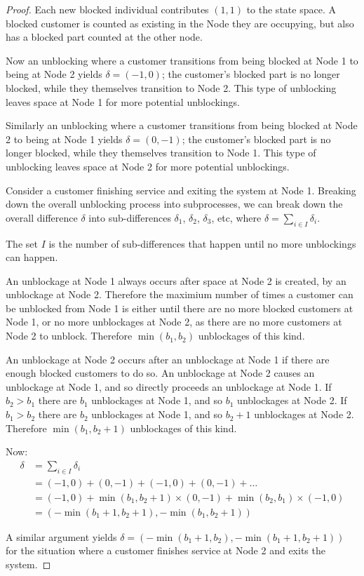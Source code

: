 \documentclass{article}
\begin{document}
\begin{proof}
  Each new blocked individual contributes $(1, 1)$ to the state space. A blocked customer is counted as existing in the Node they are occupying, but also has a blocked part counted at the other node.

  Now an unblocking where a customer transitions from being blocked at Node 1 to being at Node 2 yields $\delta = (-1, 0)$; the customer's blocked part is no longer blocked, while they themselves transition to Node 2.
  This type of unblocking leaves space at Node 1 for more potential unblockings.

  Similarly an unblocking where a customer transitions from being blocked at Node 2 to being at Node 1 yields $\delta = (0, -1)$; the customer's blocked part is no longer blocked, while they themselves transition to Node 1.
  This type of unblocking leaves space at Node 2 for more potential unblockings.

  Consider a customer finishing service and exiting the system at Node 1.
  Breaking down the overall unblocking process into subprocesses, we can break down the overall difference $\delta$ into sub-differences $\delta_1$, $\delta_2$, $\delta_3$, etc, where $\delta = \sum_{i \in I} \delta_i$.

  The set $I$ is the number of sub-differences that happen until no more unblockings can happen.

  An unblockage at Node 1 always occurs after space at Node 2 is created, by an unblockage at Node 2.
  Therefore the maximium number of times a customer can be unblocked from Node 1 is either until there are no more blocked customers at Node 1, or no more unblockages at Node 2, as there are no more customers at Node 2 to unblock.
  Therefore $\min(b_1, b_2)$ unblockages of this kind.

  An unblockage at Node 2 occurs after an unblockage at Node 1 if there are enough blocked customers to do so.
  An unblockage at Node 2 causes an unblockage at Node 1, and so directly proceeds an unblockage at Node 1.
  If $b_2 > b_1$ there are $b_1$ unblockages at Node 1, and so $b_1$ unblockages at Node 2.
  If $b_1 > b_2$ there are $b_2$ unblockages at Node 1, and so $b_2+1$ unblockages at Node 2.
  Therefore $\min(b_1, b_2+1)$ unblockages of this kind.

  Now:
  \begin{align*}
    \delta &= \sum_{i \in I} \delta_i\\
    &= (-1, 0) + (0, -1) + (-1, 0) + (0, -1) + \dots\\
    &= (-1, 0) + \min(b_1, b_2+1)\times(0, -1) + \min(b_2, b_1)\times(-1, 0)\\
    &= (-\min(b_1+1, b_2+1), -\min(b_1, b_2+1))
  \end{align*}

  A similar argument yields $\delta = (-\min(b_1+1, b_2), -\min(b_1+1, b_2+1))$ for the situation where a customer finishes service at Node 2 and exits the system.

\end{proof}
\end{document}
